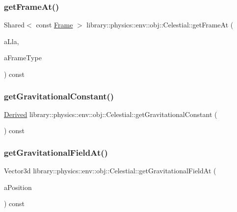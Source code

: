 \subsubsection{\texorpdfstring{get\+Frame\+At()}{getFrameAt()}}
{\footnotesize\ttfamily Shared$<$ const \hyperlink{classlibrary_1_1physics_1_1coord_1_1_frame}{Frame} $>$ library\+::physics\+::env\+::obj\+::\+Celestial\+::get\+Frame\+At (\begin{DoxyParamCaption}\item[{const \hyperlink{classlibrary_1_1physics_1_1coord_1_1spherical_1_1_l_l_a}{L\+LA} \&}]{a\+Lla,  }\item[{const \hyperlink{classlibrary_1_1physics_1_1env_1_1obj_1_1_celestial_a8585fb32125cb6c73ae1339a5ea09c79}{Celestial\+::\+Frame\+Type} \&}]{a\+Frame\+Type }\end{DoxyParamCaption}) const}

\mbox{\label{classlibrary_1_1physics_1_1env_1_1obj_1_1_celestial_a3c7c4b64ec4b37e311fe914b4ea5b9d1}} 
\subsubsection{\texorpdfstring{get\+Gravitational\+Constant()}{getGravitationalConstant()}}
{\footnotesize\ttfamily \hyperlink{classlibrary_1_1physics_1_1units_1_1_derived}{Derived} library\+::physics\+::env\+::obj\+::\+Celestial\+::get\+Gravitational\+Constant (\begin{DoxyParamCaption}{ }\end{DoxyParamCaption}) const}

\mbox{\label{classlibrary_1_1physics_1_1env_1_1obj_1_1_celestial_ac715a5cc62581070d55ab839e3309c9e}} 
\subsubsection{\texorpdfstring{get\+Gravitational\+Field\+At()}{getGravitationalFieldAt()}}
{\footnotesize\ttfamily Vector3d library\+::physics\+::env\+::obj\+::\+Celestial\+::get\+Gravitational\+Field\+At (\begin{DoxyParamCaption}\item[{const \hyperlink{classlibrary_1_1physics_1_1coord_1_1_position}{Position} \&}]{a\+Position }\end{DoxyParamCaption}) const}

